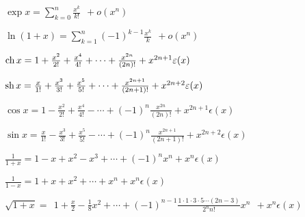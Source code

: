 \begin{frame}

\begin{center}


\pause
\smallskip

$\exp x=\sum_ {k=0}^n \frac{x^k}{k!} \ \ + o(x^n)$

\bigskip

\smallskip
\pause


\pause

$\ln(1+x)=\sum_ {k=1}^n (-1)^{k-1}\frac{x^k}{k} \ \ + o(x^n)$

\bigskip
\pause

$\mathop{\text{ch}}\nolimits x=1+\frac{x^2}{2!}+\frac{x^4}{4!}+\cdots+\frac{x^{2n}}{(2n)!}
+x^{2n+1}\varepsilon(x)$ 

\smallskip
\pause


$\mathop{\text{sh}}\nolimits x=\frac{x}{1!}+\frac{x^3}{3!}+\frac{x^5}{5!}+\cdots
+\frac{x^{2n+1}}{(2n+1)!} 
+x^{2n+2}\varepsilon(x)$

\smallskip
\pause

$\cos x=1-\frac{x^2}{2!}+\frac{x^4}{4!}-\cdots+(-1)^n\frac{x^{2n}}{(2n)!}
+x^{2n+1}\epsilon(x)$ 

\smallskip
\pause

$\sin x=\frac{x}{1!}-\frac{x^3}{3!}+\frac{x^5}{5!}-\cdots
+(-1)^n\frac{x^{2n+1}}{(2n+1)!} 
+x^{2n+2}\epsilon(x)$
\end{center}
\end{frame}


\begin{frame}

\begin{center}



\bigskip
\pause

${\displaystyle \frac{1}{1+x}}=1-x+x^2-x^3+\cdots+(-1)^nx^n+x^n\epsilon(x)$

\smallskip
\pause

${\displaystyle \frac{1}{1-x}} = 1+x+x^2+\cdots+x^n+x^n\epsilon(x)$

\medskip
\pause

$\sqrt{1+x}  =\ \ 1 + \frac{x}{2} - \frac{1}{8}x^2+ \cdots +
(-1)^{n-1} \frac{1\cdot1\cdot3\cdot5\cdots(2n-3)}{2^n n!}x^n\ \  + x^n\epsilon(x)$
\end{center}


\end{frame}

